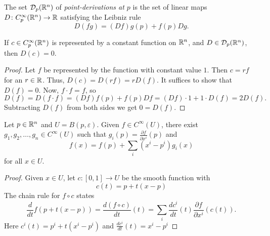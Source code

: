 \begin{frame}
  \begin{definition}
    The set ${\mathcal D}_p(\mathbb R^n)$ of {\em point-derivations at $p$} is the set of 
    linear maps $D \colon C^{\infty}_p(\mathbb R^n) \to \mathbb R$ satisfying the Leibniz rule
    \begin{displaymath}
      D(fg) = (Df)g(p) + f(p)Dg.
    \end{displaymath}
  \end{definition}
  \begin{lemma}
    If $c \in C^{\infty}_p(\mathbb R^n)$ is represented by a constant function on 
    $\mathbb R^n$, and $D \in {\mathcal D}_p(\mathbb R^n)$, then $D(c) = 0$.
  \end{lemma}
  \begin{proof}
    Let $f$ be represented by the function with constant value $1$. Then $c = rf$
    for an $r \in \mathbb R$. Thus, $D(c) = D(rf) = rD(f)$. It suffices to show that 
    $D(f) = 0$. Now, $f\cdot f = f$, so
    \begin{displaymath}
      D(f) = D(f\cdot f) = (Df)f(p) + f(p)Df = (Df) \cdot 1 + 1 \cdot D(f)= 2D(f).
    \end{displaymath}
    Subtracting $D(f)$ from both sides we get $0 = D(f)$.
  \end{proof}
\end{frame}

\begin{frame}
  \begin{lemma}
    Let $p \in \mathbb R^n$ and $U = B(p, \varepsilon)$. Given $f \in C^{\infty}(U)$,
    there exist $g_1, g_2, \dots, g_n \in C^{\infty}(U)$ such that 
    $g_i(p) = \frac{\partial f}{\partial x^i}(p)$ and
    \begin{displaymath}
      f(x) = f(p) + \sum_{i} (x^i - p^i) g_i(x)
    \end{displaymath}
    for all $x \in U$.
  \end{lemma}
  \begin{proof}
    Given $x \in U$, let $c \colon [0,1] \to U$ be the smooth function with
    \begin{displaymath}
      c(t) = p + t(x - p)
    \end{displaymath}
    The chain rule for $f \circ c$ states
    \begin{displaymath}
      \frac{d}{dt} f(p + t(x-p)) = \frac{d (f \circ c)}{dt} (t)
      = \sum_i \frac{d c^i}{dt}(t) \frac{\partial f}{\partial x^i}(c(t)).
    \end{displaymath}
    Here $c^i(t) = p^i + t(x^i - p^i)$ and $\frac{dc^i}{dt}(t) = x^i - p^i$
  \end{proof}
\end{frame}


